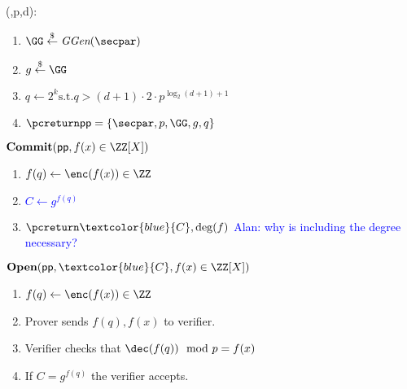\documentclass{article}
\begin{document}
\begin{mdframed}[userdefinedwidth=0.8\textwidth]
\begin{minipage}{\textwidth}
	\begin{flushleft}
	\setup(\secpar,p,d):
		\begin{enumerate}[nolistsep]
			\item $ \GG \sample \ggen(\secpar)$
			\item $ g \sample \GG$
			\item $q\gets 2^k \text{s.t.} q>(d+1) \cdot 2\cdot p^{\log_2(d+1)+1} $
			\item $\pcreturn \crs=\{\secpar,p,\GG,g,q\}$
		\end{enumerate}
		$\commit(\crs,f(x)\in \ZZ[X])$  
		\begin{enumerate}[nolistsep]
			\item 	$f(q)\gets \enc(f(x)) \in \ZZ$
			\item \textcolor{blue}{$C \gets g^{f(q)}$}
			\item $\pcreturn \textcolor{blue}{C},\deg(f)$ \textcolor{blue}{Alan: why is including the degree necessary?}
		\end{enumerate}
		$\open(\crs,\textcolor{blue}{C},f(x)\in \ZZ[X])$  
		\begin{enumerate}[nolistsep]
			\item $f(q)\gets \enc(f(x)) \in \ZZ$
			\item Prover sends $f(q),f(x)$ to verifier.
			\item Verifier checks that $\dec(f(q)) \mod p=f(x)$
			\item If $C=g^{f(q)}$ the verifier accepts.
		\end{enumerate}
	\end{flushleft}
	
\end{minipage}
\end{mdframed}
\end{document}
